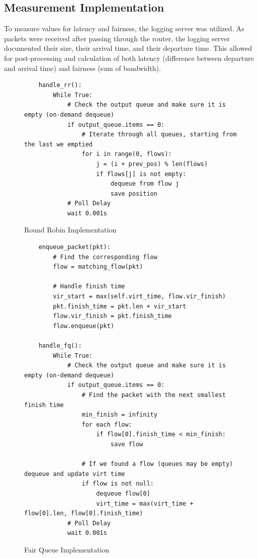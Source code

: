 \documentclass[conference]{IEEEtran}
\begin{document}
\subsection{Measurement Implementation}
To measure values for latency and fairness, the logging server was utilized.
As packets were received after passing through the router, the logging server documented their size, their arrival time, and their departure time.
This allowed for post-processing and calculation of both latency (difference between departure and arrival time) and fairness (sum of bandwidth).

\begin{figure}[tbp]
    \begin{lstlisting}
    handle_rr():
        While True:
            # Check the output queue and make sure it is empty (on-demand dequeue)
            if output_queue.items == 0:
                # Iterate through all queues, starting from the last we emptied
                for i in range(0, flows):
                    j = (i + prev_pos) % len(flows)
                    if flows[j] is not empty:
                        dequeue from flow j
                        save position
            # Poll Delay
            wait 0.001s
    \end{lstlisting}
    \caption{Round Robin Implementation}
    \label{fig:rr_impl}
\end{figure}

\begin{figure}[tbp]
    \begin{lstlisting}
    enqueue_packet(pkt):
        # Find the corresponding flow
        flow = matching_flow(pkt)

        # Handle finish time
        vir_start = max(self.virt_time, flow.vir_finish)
        pkt.finish_time = pkt.len + vir_start
        flow.vir_finish = pkt.finish_time
        flow.enqueue(pkt)

    handle_fq():
        While True:
            # Check the output queue and make sure it is empty (on-demand dequeue)
            if output_queue.items == 0:
                # Find the packet with the next smallest finish time
                min_finish = infinity
                for each flow:
                    if flow[0].finish_time < min_finish:
                        save flow

                # If we found a flow (queues may be empty) dequeue and update virt time
                if flow is not null:
                    dequeue flow[0]
                    virt_time = max(virt_time + flow[0].len, flow[0].finish_time)
            # Poll Delay
            wait 0.001s
    \end{lstlisting}
    \caption{Fair Queue Implementation}
    \label{fig:fq_impl}
\end{figure}
\end{document}
